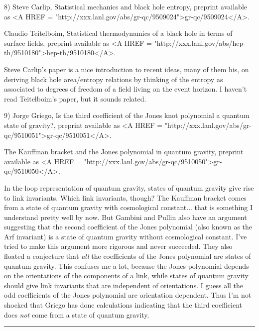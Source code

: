 8) Steve Carlip, Statistical mechanics and black hole entropy, preprint
available as <A HREF =
"http://xxx.lanl.gov/abs/gr-qc/9509024">gr-qc/9509024</A>. 

Claudio Teitelboim, Statistical thermodynamics of a black hole in
terms of surface fields, preprint available as <A HREF =
"http://xxx.lanl.gov/abs/hep-th/9510180">hep-th/9510180</A>. 
 
Steve Carlip's paper is a nice introduction to recent ideas, many of
them his, on deriving black hole area/entropy relations by thinking of
the entropy as associated to degrees of freedom of a field living on the
event horizon.  I haven't read Teitelboim's paper, but it sounds related.


9) Jorge Griego, Is the third coefficient of the Jones knot polynomial a
quantum state of gravity?, preprint available as <A HREF =
"http://xxx.lanl.gov/abs/gr-qc/9510051">gr-qc/9510051</A>.   

The Kauffman bracket and the Jones polynomial in quantum gravity,
preprint available as <A HREF =
"http://xxx.lanl.gov/abs/gr-qc/9510050">gr-qc/9510050</A>.  



In the loop representation of quantum gravity, states of quantum gravity
give rise to link invariants.  Which link invariants, though?  The
Kauffman bracket comes from a state of quantum gravity with cosmological
constant... that is something I understand pretty well by now.  But
Gambini and Pullin also have an argument suggesting that the second
coefficient of the Jones polynomial (also known as the Arf invariant) is
a state of quantum gravity without cosmological constant.  I've tried to
make this argument more rigorous and never succeeded.  They also floated a
conjecture that \emph{all} the coefficients of the Jones polynomial are
states of quantum gravity.  This confuses me a lot, because the Jones
polynomial depends on the orientations of the components of a link,
while states of quantum gravity should give link invariants that are
independent of orientations.  I guess all the odd coefficients of the
Jones polynomial are orientation dependent.  Thus I'm not shocked that
Griego has done calculations indicating that the third coefficient does
\emph{not} come from a state of quantum gravity.  
\par\noindent\rule{\textwidth}{0.4pt}

